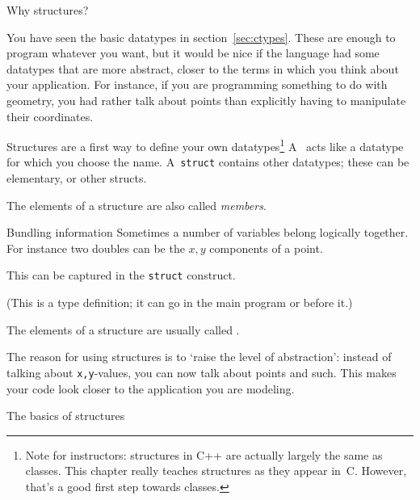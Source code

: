
 {Why structures?}
\label{sec:struct}

You have seen the basic datatypes in section~\ref{sec:ctypes}. These
are enough to program whatever you want, but it would be nice if the
language had some datatypes that are more abstract, closer to the
terms in which you think about your application. For instance, if you
are programming something to do with geometry, you had rather talk
about points than explicitly having to manipulate their coordinates.

Structures are a
first way to define your own datatypes\footnote
{Note for instructors: structures in C++ are actually largely the same
  as classes. This chapter really teaches structures as they
  appear in~C. However, that's a good first step towards classes.}
A~
acts like a datatype for which you choose the name. A~\lstinline$struct$
contains other datatypes; these can be elementary, or other structs.
%

The elements of a structure are also called
\emph{members}.
  
\begin{slide}{Bundling information}
  \label{sl:struct-why}
  Sometimes a number of variables belong logically together. For
  instance two doubles can be the $x,y$ components of a point.

  This can be captured in the \lstinline$struct$ construct.


  (This is a type definition; it can go in the main program or before it.)

The elements of a structure are usually called .
\end{slide}

The reason for using structures is to `raise the level of
abstraction': instead of talking about \lstinline{x,y}-values, you can
now talk about points and such. This makes your code look closer to
the application you are modeling.

 {The basics of structures}

